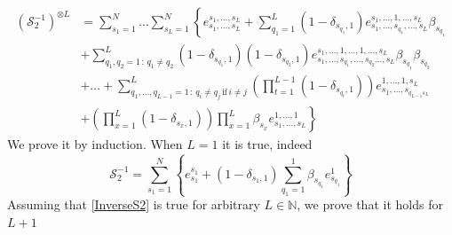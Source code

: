 \documentclass[11pt]{article}
\numberwithin{equation}{section}
\numberwithin{equation}{subsection}
\begin{document}
    \begin{equation}\label{InverseS2}
    	\begin{split}
    		\left(\mathcal{S}_{2}^{-1}\right)^{\otimes L}&=\sum_{s_{1}=1}^{N}\ldots\sum_{s_{L}=1}^{N}\left\{e_{s_{1},\ldots,s_{L}}^{s_{1},\ldots,s_{L}}+\sum_{q_{1}=1}^{L}(1-\delta_{s_{q_{1}},1})e_{s_{1},\ldots,s_{q_{1}},\ldots,s_{L}}^{s_{1},\ldots,1,\ldots,s_{L}}\beta_{s_{q_{1}}}\right. 
    		\\&+\left. \sum_{q_{1},q_{2}=1\,:\,q_{1}\neq q_{2}}^{L}(1-\delta_{s_{q_{1}},1})(1-\delta_{s_{q_{2}},1})e_{s_{1},\ldots,s_{q_{1}},\ldots,s_{q_{2}}\ldots,s_{L}}^{s_{1},\ldots,1,\ldots,1,\ldots,s_{L}}\beta_{s_{q_{1}}}\beta_{s_{q_{2}}}\right.
    		\\&+\left.
    		\ldots+	\sum_{q_{1},\ldots,q_{L-1}=1\,:\,q_{i}\neq q_{j}\,\text{if}\,i\neq j}^{L}\left(\prod_{t=1}^{L-1}(1-\delta_{s_{q_{t}},1})\right)e_{s_{1},\ldots,s_{q_{L-1}s_{L}}}^{1,\ldots,1,s_{L}}
    		\right. \\&+ \left. 
    		\left(\prod_{x=1}^{L}(1-\delta_{s_{x},1})\right)\prod_{x=1}^{L}\beta_{s_{x}}e_{s_{1},\ldots,s_{L}}^{1,\ldots,1} \right\}
    	\end{split}
    \end{equation}
    We prove it by induction. When $L=1$ it is true, indeed
    \begin{equation}
    	\mathcal{S}_{2}^{-1}=\sum_{s_{1}=1}^{N}\left\{e_{s_{1}}^{s_{1}}+(1-\delta_{s_{1},1})\sum_{q_{1}=1}^{1}\beta_{s_{q_{1}}}e_{s_{q_{1}}}^{1}\right\}
    \end{equation}
    Assuming that \eqref{InverseS2} is true for arbitrary $L\in \mathbb{N}$, we prove that it holds for $L+1$
\end{document}
